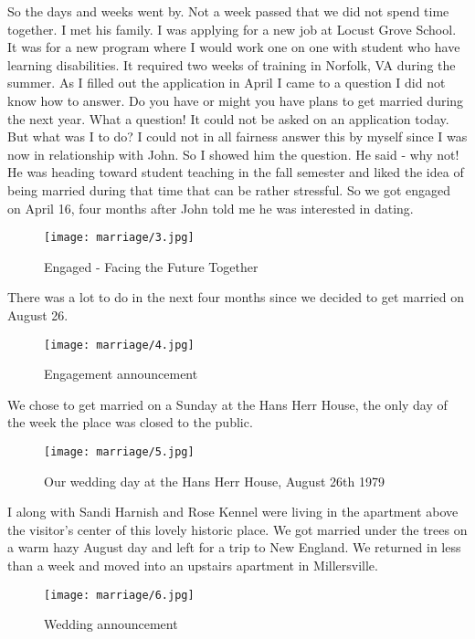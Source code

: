 So the days and weeks went by.
Not a week passed that we did not spend time together.
I met his family.
I was applying for a new job at Locust Grove School.
It was for a new program where I would work one on one with student who have learning disabilities.
It required two weeks of training in Norfolk, VA during the summer.
As I filled out the application in April I came to a question I did not know how to answer.
Do you have or might you have plans to get married during the next year.
What a question! It could not be asked on an application today.
But what was I to do? I could not in all fairness answer this by myself since I was now in relationship with John.
So I showed him the question.
He said - why not! He was heading toward student teaching in the fall semester and liked the idea of being married during that time that can be rather stressful.
So we got engaged on April 16, four months after John told me he was interested in dating.
\begin{figure}
\centering
\texttt{[image: marriage/3.jpg]}
\caption{
Engaged - Facing the Future Together
}
\end{figure}
There was a lot to do in the next four months since we decided to get married on August 26.
\begin{figure}
\centering
\texttt{[image: marriage/4.jpg]}
\caption{
Engagement announcement
}
\end{figure}
We chose to get married on a Sunday at the Hans Herr House, the only day of the week the place was closed to the public.
\begin{figure}
\centering
\texttt{[image: marriage/5.jpg]}
\caption{
Our wedding day at the Hans Herr House, August 26th 1979
}
\end{figure}
I along with Sandi Harnish and Rose Kennel were living in the apartment above the visitor's center of this lovely historic place.
We got married under the trees on a warm hazy August day and left for a trip to New England.
We returned in less than a week and moved into an upstairs apartment in Millersville.
\begin{figure}
\centering
\texttt{[image: marriage/6.jpg]}
\caption{
Wedding announcement
}
\end{figure}
